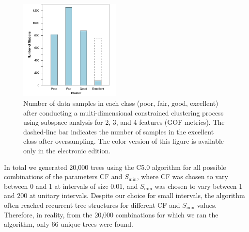 \begin{figure}[t]
	\centering
	\includegraphics[width=0.45\textwidth]{figures/pdf/figure-07}
	\caption{Number of data samples in each class (poor, fair, good, excellent) after conducting a multi-dimensional constrained \kmeans{} clustering process using subspace analysis for 2, 3, and 4 features (GOF metrics). The dashed-line bar indicates the number of samples in the excellent class after oversampling. The color version of this figure is available only in the electronic edition.}
	\label{fig:count-classes}
\end{figure}

In total we generated 20,000 trees using the C5.0 algorithm for all possible combinations of the parameters CF and $S_{\min}$, where CF was chosen to vary between 0 and 1 at intervals of size 0.01, and $S_{\min}$ was chosen to vary between 1 and 200 at unitary intervals. Despite our choice for small intervals, the algorithm often reached recurrent tree structures for different CF and $S_{\min}$ values. Therefore, in reality, from the 20,000 combinations for which we ran the algorithm, only 66 unique trees were found. 



